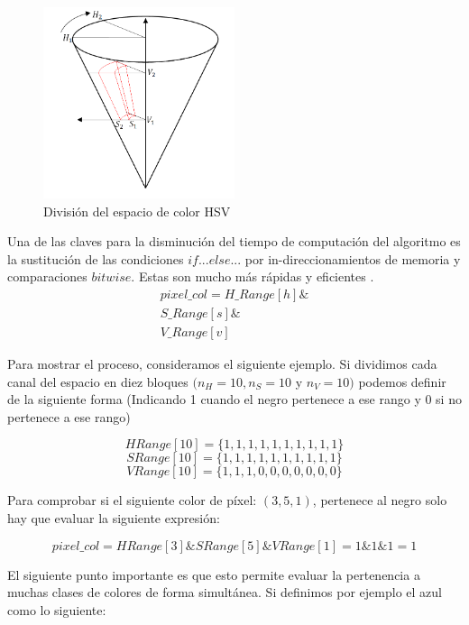 \begin{figure}[h]
	\centering
	\includegraphics[width=0.5\textwidth,natwidth=659,natheight=659]{../Images/c2/DividingSubSpace.png}
	\caption{Divisi\'on del espacio de color HSV}
	\label{fig:DividingSubSpace}
\end{figure}

Una de las claves para la disminución del tiempo de computaci\'on del algoritmo es la sustitución de las condiciones $if...else...$ por in-direccionamientos de memoria y comparaciones $bitwise$. Estas son mucho m\'as r\'apidas y eficientes \cite{JamesBruce_CMU_SEG}. \\

\begin{equation}
\begin{split}
pixel\_col = H\_Range[h] \& \\
S\_Range[s] \& \\
V\_Range[v] 
\end{split}
\end{equation}
	

Para mostrar el proceso, consideramos el siguiente ejemplo. Si dividimos cada canal del espacio en diez bloques $(n_H = 10, n_S = 10$ y $n_V = 10)$ podemos definir de la siguiente forma (Indicando 1 cuando el negro pertenece a ese rango y 0 si no pertenece a ese rango)

{\centering
\[HRange[10] = \{1, 1, 1, 1, 1, 1, 1, 1, 1, 1\}\]
\[SRange[10] = \{1, 1, 1, 1, 1, 1, 1, 1, 1, 1\}\]
\[VRange[10] = \{1, 1, 1, 0, 0, 0, 0, 0, 0, 0\}\]
} 

Para comprobar si el siguiente color de p\'ixel:  $(3, 5, 1)$, pertenece al negro solo hay que evaluar la siguiente expresi\'on:

\[ pixel\_col = HRange[3] \& SRange[5] \& VRange[1] = 1 \& 1 \& 1 = 1 \]


El siguiente punto importante es que esto permite evaluar la pertenencia a muchas clases de colores de forma simultánea. Si definimos por ejemplo el azul como lo siguiente:

